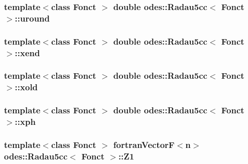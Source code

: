 \hypertarget{classodes_1_1Radau5cc_aecb9b0f5b18f8bb94a14435e20bdd65b}{
\subsubsection[{uround}]{\setlength{\rightskip}{0pt plus 5cm}template$<$class Fonct $>$ double {\bf odes\-::\-Radau5cc}$<$ Fonct $>$\-::uround\hspace{0.3cm}{\ttfamily [private]}}}\label{classodes_1_1Radau5cc_aecb9b0f5b18f8bb94a14435e20bdd65b}
\hypertarget{classodes_1_1Radau5cc_ac6e95e640106e403c36b260fa97d1bb6}{
\subsubsection[{xend}]{\setlength{\rightskip}{0pt plus 5cm}template$<$class Fonct $>$ double {\bf odes\-::\-Radau5cc}$<$ Fonct $>$\-::xend\hspace{0.3cm}{\ttfamily [private]}}}\label{classodes_1_1Radau5cc_ac6e95e640106e403c36b260fa97d1bb6}
\hypertarget{classodes_1_1Radau5cc_a46e492dffaba4f529881e74bda794bbd}{
\subsubsection[{xold}]{\setlength{\rightskip}{0pt plus 5cm}template$<$class Fonct $>$ double {\bf odes\-::\-Radau5cc}$<$ Fonct $>$\-::xold\hspace{0.3cm}{\ttfamily [private]}}}\label{classodes_1_1Radau5cc_a46e492dffaba4f529881e74bda794bbd}
\hypertarget{classodes_1_1Radau5cc_a9f9ba87113cef033764f5282f987a832}{
\subsubsection[{xph}]{\setlength{\rightskip}{0pt plus 5cm}template$<$class Fonct $>$ double {\bf odes\-::\-Radau5cc}$<$ Fonct $>$\-::xph\hspace{0.3cm}{\ttfamily [private]}}}\label{classodes_1_1Radau5cc_a9f9ba87113cef033764f5282f987a832}
\hypertarget{classodes_1_1Radau5cc_af04c79b433c9fabdf12fe44a52158a67}{
\subsubsection[{Z1}]{\setlength{\rightskip}{0pt plus 5cm}template$<$class Fonct $>$ {\bf fortran\-Vector\-F}$<${\bf n}$>$ {\bf odes\-::\-Radau5cc}$<$ Fonct $>$\-::Z1\hspace{0.3cm}{\ttfamily [protected]}}}\label{classodes_1_1Radau5cc_af04c79b433c9fabdf12fe44a52158a67}
